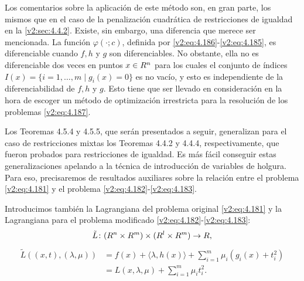 Los comentarios sobre la aplicación de este método son, en gran parte, los mismos que en el caso de la penalización cuadrática de restricciones de igualdad en la \cref{v2:sec:4.4.2}. Existe, sin embargo, una diferencia que merece ser mencionada. La función $\varphi(\cdot; c)$, definida por \eqref{v2:eq:4.186}-\eqref{v2:eq:4.185}, es diferenciable cuando $f, h$ y $g$ son diferenciables. No obstante, ella no es diferenciable dos veces en puntos $x \in R^n$ para los cuales el conjunto de índices $I(x) = \{i = 1, \dots, m \mid g_i(x) = 0\}$ es no vacío, y esto es independiente de la diferenciabilidad de $f, h$ y $g$. Esto tiene que ser llevado en consideración en la hora de escoger un método de optimización irrestricta para la resolución de los problemas \eqref{v2:eq:4.187}.

Los Teoremas 4.5.4 y 4.5.5, que serán presentados a seguir, generalizan para el caso de restricciones mixtas los Teoremas 4.4.2 y 4.4.4, respectivamente, que fueron probados para restricciones de igualdad. Es más fácil conseguir estas generalizaciones apelando a la técnica de introducción de variables de holgura. Para eso, precisaremos de resultados auxiliares sobre la relación entre el problema \eqref{v2:eq:4.181} y el problema \eqref{v2:eq:4.182}-\eqref{v2:eq:4.183}.


Introducimos también la Lagrangiana del problema original \eqref{v2:eq:4.181} y la Lagrangiana para el problema modificado \eqref{v2:eq:4.182}-\eqref{v2:eq:4.183}:
\[
    \tilde{L} \colon (R^n \times R^m) \times (R^l \times R^m) \to R,
\]
\begin{align*}
    \tilde{L}((x, t), (\lambda, \mu)) &= f(x) + \langle \lambda, h(x) \rangle + \sum_{i=1}^m \mu_i (g_i(x) + t_i^2) \\
    &= L(x, \lambda, \mu) + \sum_{i=1}^m \mu_i t_i^2.
\end{align*}


